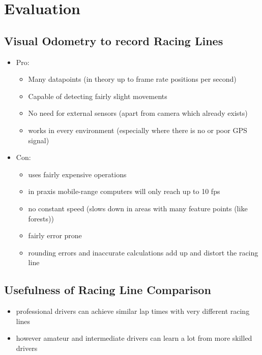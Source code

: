 \section{Evaluation}
\label{sec:evaluation}

\subsection{Visual Odometry to record Racing Lines}

\begin{itemize}
\item Pro: 
  \begin{itemize}
  \item Many datapoints (in theory up to frame rate positions per second)
  \item Capable of detecting fairly slight movements
  \item No need for external sensors (apart from camera which already exists)
  \item works in every environment (especially where there is no or poor GPS signal)
  \end{itemize}

\item Con:
  \begin{itemize}
  \item uses fairly expensive operations
  \item in praxis mobile-range computers will only reach up to 10 fps
  \item no constant speed (slows down in areas with many feature points (like forests))
  \item fairly error prone
  \item rounding errors and inaccurate calculations add up and distort the racing line
  \end{itemize}
\end{itemize}
\subsection{Usefulness of Racing Line Comparison}
\begin{itemize}
  \item professional drivers can achieve similar lap times with very different racing lines
  \item however amateur and intermediate drivers can learn a lot from more skilled drivers
\end{itemize}


\clearpage
